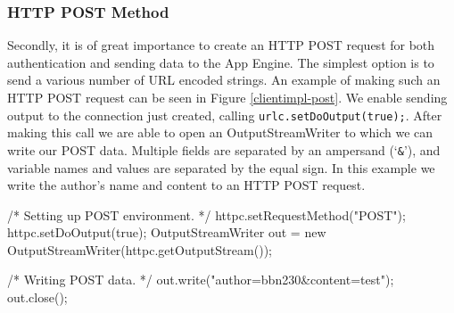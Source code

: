 \subsubsection{HTTP POST Method}
Secondly, it is of great importance to create an HTTP POST request for both
authentication and sending data to the App Engine. The simplest option is to send
a various number of URL encoded strings. An example of making such an HTTP POST
request can be seen in Figure \ref{clientimpl-post}. We enable sending output to
the connection just created, calling \texttt{urlc.setDoOutput(true);}. After
making this call we are able to open an OutputStreamWriter to which we can write
our POST data. Multiple fields are separated by an ampersand (`\texttt{\&}'),
and variable names and values are separated by the equal sign. In this example we
write the author's name and content to an HTTP POST request.

\begin{figure*}[ht] %
\begin{center}
\begin{code}
/* Setting up POST environment. */
httpc.setRequestMethod("POST");
httpc.setDoOutput(true);
OutputStreamWriter out = new OutputStreamWriter(httpc.getOutputStream());

/* Writing POST data. */
out.write("author=bbn230&content=test");
out.close();
\end{code}
\caption{Making an HTTP POST request.\label{clientimpl-post}}
\end{center}
\end{figure*}

% 

